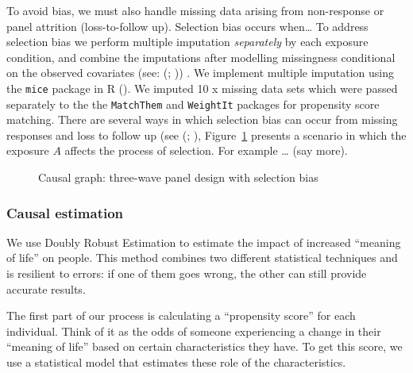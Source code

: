 \documentclass[
  singlecolumn,
  9pt]{scrartcl}
\begin{document}
To avoid bias, we must also handle missing data arising from
non-response or panel attrition (loss-to-follow up). Selection bias
occurs when\ldots{} To address selection bias we perform multiple
imputation \emph{separately} by each exposure condition, and combine the
imputations after modelling missingness conditional on the observed
covariates (see: (; )) . We
implement multiple imputation using the \texttt{mice} package in R
(). We imputed 10 x missing
data sets which were passed separately to the the \texttt{MatchThem} and
\texttt{WeightIt} packages for propensity score matching. There are
several ways in which selection bias can occur from missing responses
and loss to follow up (see (; ),
Figure~\ref{fig-outcomewide-dag} presents a scenario in which the
exposure \(A\) affects the process of selection. For example \ldots{}
(say more).

\begin{figure}


\caption{\label{fig-outcomewide-dag}Causal graph: three-wave panel
design with selection bias}

\end{figure}%

\subsubsection{Causal estimation}\label{causal-estimation}

We use Doubly Robust Estimation to estimate the impact of increased
``meaning of life'' on people. This method combines two different
statistical techniques and is resilient to errors: if one of them goes
wrong, the other can still provide accurate results.

The first part of our process is calculating a ``propensity score'' for
each individual. Think of it as the odds of someone experiencing a
change in their ``meaning of life'' based on certain characteristics
they have. To get this score, we use a statistical model that estimates
these role of the characteristics.
\end{document}
